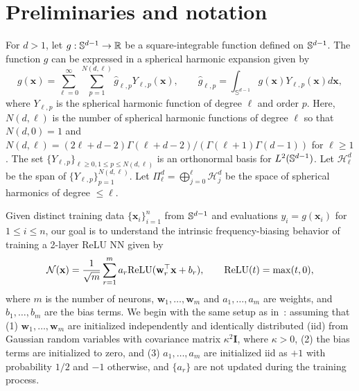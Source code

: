 \documentclass{article} %
\begin{document}
\section{Preliminaries and notation}\label{section.prelim}
For $d>1$, let $g: {\mathbb{S}}^{d-1} \rightarrow \mathbb{R}$ be a square-integrable function defined on ${\mathbb{S}}^{d-1}$. The function $g$ can be expressed in a spherical harmonic expansion given by 
\begin{equation}\label{eq:g_lp}
g(\mathbf{x}) = \sum_{\ell=0}^\infty \sum_{p=1}^{N(d,\ell)} \hat{g}_{\ell,p} Y_{\ell,p}(\mathbf{x}), \qquad \hat{g}_{\ell,p} = \int_{\mathbb{S}^{d-1}}g(\mathbf{x}) {Y_{\ell,p}}(\mathbf{x}) d\mathbf{x},
\end{equation}
where $Y_{\ell,p}$ is the spherical harmonic function of degree $\ell$ and order $p$. Here, $N(d,\ell)$ is the number of spherical harmonic functions of degree $\ell$ so that $N(d,0) = 1$ and $N(d,\ell) = (2\ell+d-2)\Gamma(\ell+d-2)/(\Gamma(\ell+1)\Gamma(d-1))$ for $\ell\geq 1$. The set $\{Y_{\ell,p}\}_{\ell \geq 0,1 \leq p \leq N(d,\ell)}$ is an orthonormal basis for $L^2({\mathbb{S}}^{d-1})$. Let $\mathcal{H}^d_\ell$ be the span of $\{Y_{\ell,p}\}_{p=1}^{N(d,\ell)}$. Let $\Pi_\ell^d = \bigoplus_{j=0}^\ell \mathcal{H}_j^d$ be the space of spherical harmonics of degree $\leq\ell$.

Given distinct training data $\{\mathbf{x}_i\}_{i=1}^n$ from ${\mathbb{S}}^{d-1}$ and evaluations $y_i = g(\mathbf{x}_i)$ for $1\leq i\leq n$, our goal is to understand the intrinsic  frequency-biasing behavior of training a 2-layer ReLU NN given by   
\begin{equation}\label{eq:NN}
    {\mathcal{N}}(\mathbf{x}) = \frac{1}{\sqrt{m}} \sum_{r=1}^m a_r {\rm ReLU}(\mathbf{w}_r^\top \mathbf{x} + {b}_r), \qquad {\rm ReLU}(t) = \max(t,0),
\end{equation}
where $m$ is the number of neurons, $\mathbf{w}_1,\ldots,\mathbf{w}_m$ and $a_1,\ldots,a_m$ are weights, and ${b}_1,\ldots,{b}_m$ are the bias terms. We begin with the same setup as in~\cite{basri2020frequency}: assuming that (1) $\mathbf{w}_1,\ldots,\mathbf{w}_m$ are initialized independently and identically distributed (iid) from Gaussian random variables with covariance matrix $\kappa^2\mathbf{I}$, where $\kappa > 0$, (2) the bias terms are initialized to zero, and (3) $a_1,\ldots,a_m$ are initialized iid as $+1$ with probability $1/2$ and $-1$ otherwise, and $\{a_r\}$ are not updated during the training process.%
\end{document}

